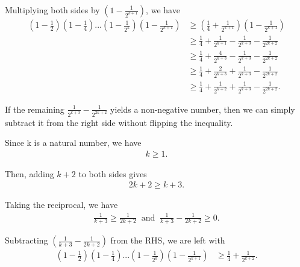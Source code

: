 \documentclass[12pt]{article}
\begin{document}
Multiplying both sides by $(1-\frac{1}{2^{k+1}})$, we have
\begin{align*}
    \left(1-\frac{1}{2}\right)\left(1-\frac{1}{4}\right)...\left(1-\frac{1}{2^k}\right)\left(1-\frac{1}{2^{k+1}}\right) & \geq \left(\frac{1}{4} + \frac{1}{2^{k+1}}\right) \left(1-\frac{1}{2^{k+1}}\right) \\
                                                                                                                        & \geq \frac{1}{4} + \frac{1}{2^{k+1}} - \frac{1}{2^{k+3}} - \frac{1}{2^{2k+2}}      \\
                                                                                                                        & \geq \frac{1}{4} + \frac{4}{2^{k+3}} - \frac{1}{2^{k+3}} - \frac{1}{2^{2k+2}}      \\
                                                                                                                        & \geq \frac{1}{4} + \frac{2}{2^{k+3}} + \frac{1}{2^{k+3}} - \frac{1}{2^{2k+2}}      \\
                                                                                                                        & \geq \frac{1}{4} + \frac{1}{2^{k+2}} + \frac{1}{2^{k+3}} - \frac{1}{2^{2k+2}}.
\end{align*}

If the remaining $\frac{1}{2^{k+3}} - \frac{1}{2^{2k+2}}$ yields a non-negative number, then we can simply subtract it from the right side without flipping the inequality.

Since k is a natural number, we have
\begin{align*}
    k \geq 1.
\end{align*}

Then, adding $k+2$ to both sides gives
\begin{align*}
    2k+2 \geq k+3.
\end{align*}

Taking the reciprocal, we have
\begin{align*}
    \frac{1}{k+3} \geq \frac{1}{2k+2} ~ \text{ and } ~ \frac{1}{k+3} - \frac{1}{2k+2} \geq 0.
\end{align*}

Subtracting $(\frac{1}{k+3} - \frac{1}{2k+2})$ from the RHS, we are left with
\begin{align*}
    \left(1-\frac{1}{2}\right)\left(1-\frac{1}{4}\right)...\left(1-\frac{1}{2^k}\right)\left(1-\frac{1}{2^{k+1}}\right) & \geq \frac{1}{4} + \frac{1}{2^{k+2}}.
\end{align*}
\end{document}
